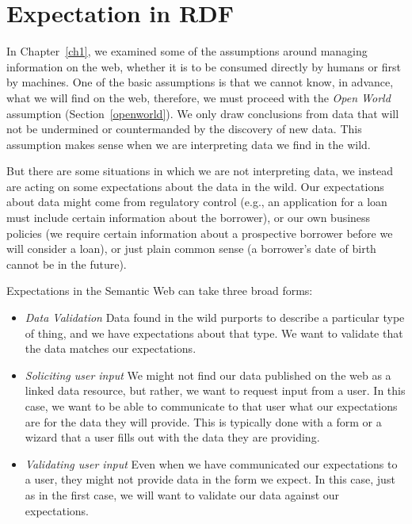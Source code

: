 \section{Expectation in RDF}


In Chapter~\ref{ch1}, we examined some of the assumptions around managing information on the web, 
whether it is to be consumed directly by humans or first by machines.  One of the basic assumptions is
that we cannot know, in advance, what we will find on the web, therefore, we must proceed with the \emph{Open World} assumption (Section~\ref{openworld}).  We only draw conclusions from data that will not be undermined or countermanded by the discovery of new data.  This assumption makes sense when we are interpreting data we find in the wild.

But there are some situations in which we are not interpreting data, we instead are acting on some expectations about the
data in the wild.  Our expectations about data might come from regulatory control (e.g., an application for a loan must
include certain information about the borrower), or our own business policies (we require certain information about a
prospective borrower before we will consider a loan), or just plain common sense (a borrower's date of birth cannot be in
the future).

Expectations in the Semantic Web can take three broad forms:

\begin{itemize}
    \item \emph{Data Validation} \label{datav} Data found in the wild purports to describe a particular type of thing, and we have
    expectations about that type.  We want to validate that the data matches our expectations.

  \item \emph{Soliciting user input} \label{form}
      We might not find our data published on the web as a linked data resource, but
      rather, we want to request input from a user.  In this case, we want to be able to communicate to that user what
      our expectations are for the data they will provide.  This is typically done with a form or a wizard that a user
      fills out with the data they are providing.

    \item \emph{Validating user input} \label{userv} Even when we have communicated our expectations to a user,
      they might not provide 
      data in the form we expect.  In this case, just as in the first case, we will want to validate our data against our
      expectations.
\end{itemize}

